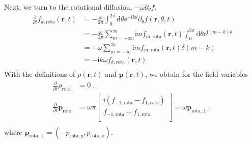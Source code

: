 \documentclass[10pt,aspectratio=43,mathserif,table]{beamer}
\begin{document}
\begin{frame}
    \small
    Next, we turn to the rotational diffusion, $-\omega \partial _{\theta}f$. 
    \begin{equation}
        \begin{aligned}
            \frac{\partial}{\partial t}f_{k,\mathrm{rota}}\left( \mathbf{r},t \right) &=-\frac{\omega}{2\pi}\int_0^{2\pi}{\mathrm{d}\theta \mathrm{e}^{-\mathrm{i}k\theta}\partial _{\theta}f\left( \mathbf{r},\theta ,t \right)}\\
            &=-\frac{\omega}{2\pi}\sum_{m=-\infty}^{\infty}{\mathrm{i}mf_{m,\mathrm{rota}}\left( \mathbf{r},t \right) \int_0^{2\pi}{\mathrm{d}\theta \mathrm{e}^{\mathrm{i}\left( m-k \right) \theta}}}\\
            &=-\omega \sum_{m=-\infty}^{\infty}{\mathrm{i}mf_{m,\mathrm{rota}}\left( \mathbf{r},t \right) \delta \left( m-k \right)}\\
            &=-\mathrm{i}k\omega f_{k,\mathrm{rota}}\left( \mathbf{r},t \right)\\
        \end{aligned}
    \end{equation}
    With the definitions of $\rho \left( \mathbf{r},t \right)$ and $\boldsymbol{p}\left( \mathbf{r},t \right)$, we obtain for the field variables
    \begin{equation}
        \begin{aligned}
            \frac{\partial}{\partial t}\rho _{\mathrm{rota}}&=0\;,\\
            \frac{\partial}{\partial t}\boldsymbol{p}_{\mathrm{rota}}& =\omega \pi \left[ \begin{array}{c}
            \mathrm{i}\left( f_{-1,\mathrm{rota}}-f_{1,\mathrm{rota}} \right)\\
            f_{-1,\mathrm{rota}}+f_{1,\mathrm{rota}}\\
        \end{array} \right] =\omega \boldsymbol{p}_{\mathrm{rota},\bot}\;,\\
        \end{aligned}
    \end{equation}
    where $\boldsymbol{p}_{\mathrm{rota},\bot}=\left( -p_{\mathrm{rota},y},p_{\mathrm{rota},x} \right)$.
\end{frame}
\end{document}
